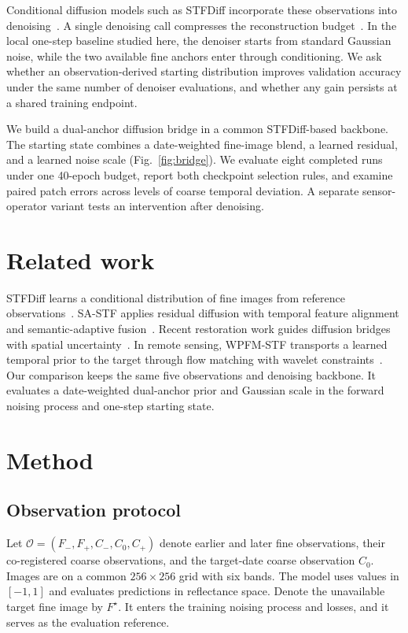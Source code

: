 \documentclass{article}
\newcommand{\obs}{\mathcal{O}}
\newcommand{\target}{F^\star}
\begin{document}
Conditional diffusion models such as STFDiff incorporate these observations into denoising~\cite{huang2024stfdiff}. A single denoising call compresses the reconstruction budget~\cite{song2021ddim}. In the local one-step baseline studied here, the denoiser starts from standard Gaussian noise, while the two available fine anchors enter through conditioning. We ask whether an observation-derived starting distribution improves validation accuracy under the same number of denoiser evaluations, and whether any gain persists at a shared training endpoint.

We build a dual-anchor diffusion bridge in a common STFDiff-based backbone. The starting state combines a date-weighted fine-image blend, a learned residual, and a learned noise scale (Fig.~\ref{fig:bridge}). We evaluate eight completed runs under one 40-epoch budget, report both checkpoint selection rules, and examine paired patch errors across levels of coarse temporal deviation. A separate sensor-operator variant tests an intervention after denoising.

\section{Related work}
STFDiff learns a conditional distribution of fine images from reference observations~\cite{huang2024stfdiff}. SA-STF applies residual diffusion with temporal feature alignment and semantic-adaptive fusion~\cite{zhang2026sastf}. Recent restoration work guides diffusion bridges with spatial uncertainty~\cite{tu2026udbm}. In remote sensing, WPFM-STF transports a learned temporal prior to the target through flow matching with wavelet constraints~\cite{hu2026wpfm}. Our comparison keeps the same five observations and denoising backbone. It evaluates a date-weighted dual-anchor prior and Gaussian scale in the forward noising process and one-step starting state.

\section{Method}
\subsection{Observation protocol}
Let $\obs=(F_-,F_+,C_-,C_0,C_+)$ denote earlier and later fine observations, their co-registered coarse observations, and the target-date coarse observation $C_0$. Images are on a common $256\times256$ grid with six bands. The model uses values in $[-1,1]$ and evaluates predictions in reflectance space. Denote the unavailable target fine image by $\target$. It enters the training noising process and losses, and it serves as the evaluation reference.
\end{document}
